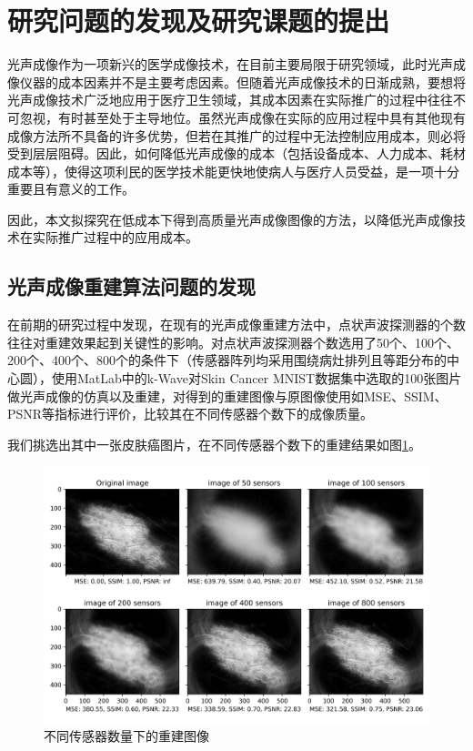 \section{研究问题的发现及研究课题的提出}
\label{sec:related_work}
光声成像作为一项新兴的医学成像技术，在目前主要局限于研究领域，此时光声成像仪器的成本因素并不是主要考虑因素。但随着光声成像技术的日渐成熟，要想将光声成像技术广泛地应用于医疗卫生领域，其成本因素在实际推广的过程中往往不可忽视，有时甚至处于主导地位。虽然光声成像在实际的应用过程中具有其他现有成像方法所不具备的许多优势，但若在其推广的过程中无法控制应用成本，则必将受到层层阻碍。因此，如何降低光声成像的成本（包括设备成本、人力成本、耗材成本等），使得这项利民的医学技术能更快地使病人与医疗人员受益，是一项十分重要且有意义的工作。

因此，本文拟探究在低成本下得到高质量光声成像图像的方法，以降低光声成像技术在实际推广过程中的应用成本。

\subsection{光声成像重建算法问题的发现}
在前期的研究过程中发现，在现有的光声成像重建方法中，点状声波探测器的个数往往对重建效果起到关键性的影响。对点状声波探测器个数选用了50个、100个、200个、400个、800个的条件下（传感器阵列均采用围绕病灶排列且等距分布的中心圆），使用MatLab中的k-Wave对Skin Cancer MNIST数据集中选取的100张图片做光声成像的仿真以及重建，对得到的重建图像与原图像使用如MSE、SSIM、PSNR等指标进行评价，比较其在不同传感器个数下的成像质量。

我们挑选出其中一张皮肤癌图片，在不同传感器个数下的重建结果如图\ref{img102}。

\begin{figure}[h]
	\centering
	\includegraphics[width=0.75\columnwidth]{image/chap01/img_1_02.png}
	\caption{不同传感器数量下的重建图像}
	\label{img102}
\end{figure}

